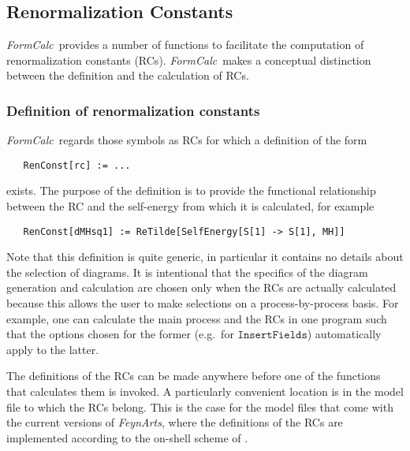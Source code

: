 \documentclass[twoside,11pt]{article}
\makeatletter
\def\indextt#1{\index{#1@\texttt{#1}}}
\def\FA{\textit{FeynArts}}
\def\FC{\textit{FormCalc}}
\def\Code#1{\ensuremath{\texttt{#1}}}
\def\eg{e.g.\ }
\makeatother
\begin{document}

\subsection{Renormalization Constants}%
\label{sect:renconst}%

\FC\ provides a number of functions to facilitate the computation of
renormalization constants (RCs).  \FC\ makes a conceptual distinction
between the definition and the calculation of RCs.


\subsubsection{Definition of renormalization constants}

\FC\ regards those symbols as RCs for which a definition of the form
\begin{verbatim}
   RenConst[rc] := ...
\end{verbatim}
\indextt{RenConst}%
exists.  The purpose of the definition is to provide the functional
relationship between the RC and the self-energy from which it is
calculated, for example
\begin{verbatim}
   RenConst[dMHsq1] := ReTilde[SelfEnergy[S[1] -> S[1], MH]]
\end{verbatim}
Note that this definition is quite generic, in particular it contains no
details about the selection of diagrams.  It is intentional that the
specifics of the diagram generation and calculation are chosen only when
the RCs are actually calculated because this allows the user to make
selections on a process-by-process basis.  For example, one can calculate
the main process and the RCs in one program such that the options chosen
for the former (\eg for \Code{InsertFields}) automatically apply to the
latter.

The definitions of the RCs can be made anywhere before one of the
functions that calculates them is invoked.  A particularly convenient
location is in the model file to which the RCs belong.  This is the case
for the model files that come with the current versions of \FA, where the
definitions of the RCs are implemented according to the on-shell scheme of
\cite{De93}.
\end{document}
